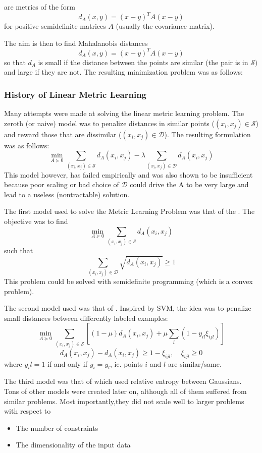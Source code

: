 \documentclass[11pt]{scrartcl}
\begin{document}
\begin{defn}
 are metrics of the form $$d_{A}(x,y)=(x-y)^{T}A(x-y)$$ for positive semidefinite matrices $A$ (usually the covariance matrix).
\end{defn}
The aim is then to find Mahalanobis distances $$d_{A}(x,y)=(x-y)^{T}A(x-y)$$ so that $d_A$ is small if the distance between the points are similar (the pair is in $\mathcal{S})$ and large if they are not. The resulting minimization problem was as follows: 

\subsubsection{History of Linear Metric Learning}

Many attempts were made at solving the linear metric learning problem. The zeroth (or naive) model was to penalize distances in similar points ($(x_i,x_j) \in \mathcal{S}$) and reward those that are dissimilar ($(x_i,x_j) \in \mathcal{D}$). The resulting formulation was as follows: 
$$\min_{A \succeq 0} \sum_{(x_i,x_j) \in \mathcal{S}}d_{A}(x_i,x_j)-\lambda\sum_{(x_i,x_j) \in \mathcal{D}}d_{A}(x_i,x_j)$$
This model however, has failed empirically and was also shown to be insufficient because poor scaling or bad choice of $\mathcal{D}$ could drive the A to be very large and lead to a useless (nontractable) solution.

The first model used to solve the Metric Learning Problem was that of the . The objective was to find $$\min_{A \succeq 0} \sum_{(x_i,x_j) \in \mathcal{S}}d_{A}(x_i,x_j)$$
such that $$\sum_{(x_i,x_j)\in \mathcal{D}}\sqrt{d_{A}(x_i,x_j)} \ge 1$$
This problem could be solved with semidefinite programming (which is a convex problem). 

The second model used was that of . Inspired by SVM, the idea was to penalize small distances between differently labeled examples: 
$$\min_{A \succeq 0}\sum_{(x_i,x_j) \in \mathcal{S}}\left[(1-\mu)d_{A}(x_i,x_j)+\mu\sum_{l}(1-y_{il}\xi_{ijl})\right]$$ $$d_{A}(x_i,x_j)-d_{A}(x_i,x_j) \ge 1-\xi_{ijl}, \quad \xi_{ijl} \ge 0$$ where $y_il=1$ if and only if $y_i=y_l$, ie. points $i$ and $l$ are similar/same. 

The third model was that of  which used relative entropy between Gaussians. Tons of other models were created later on, although all of them suffered from similar problems. Most importantly,they did not scale well to larger problems with respect to
\begin{itemize}
    \item The number of constraints
    \item The dimensionality of the input data
\end{itemize}
\end{document}
